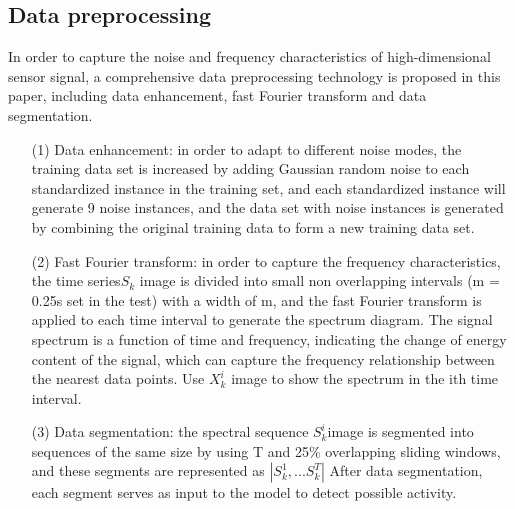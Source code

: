 \documentclass{article}
\begin{document}
\subsection{Data preprocessing}
In order to capture the noise and frequency characteristics of high-dimensional sensor signal, a comprehensive data preprocessing technology is proposed in this paper, including data enhancement, fast Fourier transform and data segmentation.
\begin{itemize}
    \item [(1)]Data enhancement: in order to adapt to different noise modes, the training data set is increased by adding Gaussian random noise to each standardized instance in the training set, and each standardized instance will generate 9 noise instances, and the data set with noise instances is generated by combining the original training data to form a new training data set.
    \item [(2)]Fast Fourier transform: in order to capture the frequency characteristics, the time series$S_{k}$ image is divided into small non overlapping intervals (m = 0.25s set in the test) with a width of m, and the fast Fourier transform is applied to each time interval to generate the spectrum diagram.  The
signal spectrum is a function of time and frequency, indicating the change of energy content of the signal, which can capture the frequency relationship between the nearest data points. Use $X_{k}^{i}$ image to show the spectrum in the ith time interval.
    \item [(3)]Data segmentation: the spectral sequence $S_{k}^{i}$image is segmented into sequences of the same size by using T and 25\% overlapping sliding windows, and these segments are represented as $|S_{k}^{1},...S_{k}^{T}|$ After data segmentation, each segment serves as input to the model to detect possible activity.
\end{itemize}
\end{document}
